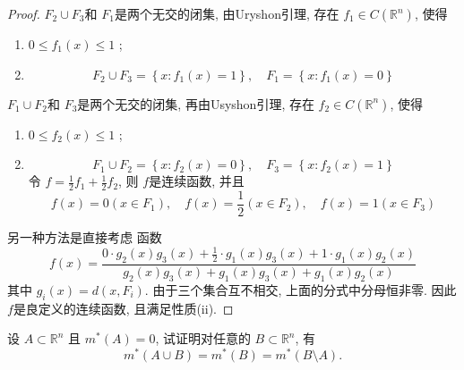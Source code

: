 \documentclass[../main.tex]{subfiles}
\begin{document}
\begin{proof}
   \(  F_2\cup F_3  \)和 \(  F_1  \)是两个无交的闭集,    由Uryshon引理, 存在 \(  f_1\in C\left( \mathbb{R} ^{n} \right)   \), 使得 
    \begin{enumerate}
        \item \(  0\le f_1\left( x \right)\le 1   \) ;
        \item \[
        F_2\cup F_3= \left\{ x: f_1\left( x \right)= 1  \right\},\quad F_1= \left\{ x:f_1\left( x \right)= 0  \right\}
        \]
    \end{enumerate}

    \(  F_1\cup F_2  \)和 \(  F_3  \)是两个无交的闭集,  再由Usyshon引理, 存在 \(  f_2\in C\left( \mathbb{R} ^{n} \right)   \), 使得
    \begin{enumerate}
        \item \(  0\le f_2\left( x \right)\le 1   \) ;
        \item \[
        F_1\cup F_2= \left\{ x:f_2\left( x \right)= 0  \right\},  \quad F_3= \left\{ x:f_2\left( x \right)= 1  \right\}
        \]令 \(  f=\frac{1}{2} f_1+ \frac{1}{2}f_2  \), 则 \(  f  \)是连续函数, 并且 \[
        f\left( x \right)= 0\left( x\in F_1 \right), \quad f\left( x \right)=    \frac{1}{2}\left( x\in F_2 \right),\quad f\left( x \right)= 1\left( x\in F_3 \right)  
        \]  
        
    \end{enumerate}
     
     
    
        
        另一种方法是直接考虑 函数 \[
        f(x) = \frac{0 \cdot g_2(x)g_3(x) + \frac{1}{2} \cdot g_1(x)g_3(x) + 1 \cdot g_1(x)g_2(x)}{g_2(x)g_3(x) + g_1(x)g_3(x) + g_1(x)g_2(x)}
        \]其中 \(  g_{i}\left( x \right)= d\left( x,F_{i} \right)    \). 由于三个集合互不相交, 上面的分式中分母恒非零. 因此 \(  f  \)是良定义的连续函数, 且满足性质(ii).  
\end{proof}
\begin{exercise}{}{}
设 $A \subset \mathbb{R}^n$ 且 $m^*(A)=0$, 试证明对任意的 $B \subset \mathbb{R}^n$, 有
\[
m^*(A \cup B) = m^*(B) = m^*(B \setminus A).
\]
\end{exercise}
\end{document}
